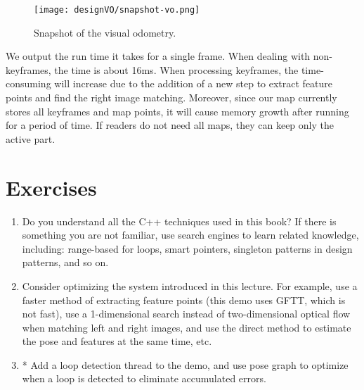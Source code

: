 \begin{figure}[!htp]
	\centering    
	\texttt{[image: designVO/snapshot-vo.png]}\\
	\caption{Snapshot of the visual odometry.}
	\label{fig:snapshot-vo}
\end{figure}

We output the run time it takes for a single frame. When dealing with non-keyframes, the time is about 16ms. When processing keyframes, the time-consuming will increase due to the addition of a new step to extract feature points and find the right image matching. Moreover, since our map currently stores all keyframes and map points, it will cause memory growth after running for a period of time. If readers do not need all maps, they can keep only the active part.

\section*{Exercises}
\begin{enumerate}
	\item Do you understand all the C++ techniques used in this book? If there is something you are not familiar, use search engines to learn related knowledge, including: range-based for loops, smart pointers, singleton patterns in design patterns, and so on.
	\item Consider optimizing the system introduced in this lecture. For example, use a faster method of extracting feature points (this demo uses GFTT, which is not fast), use a 1-dimensional search instead of two-dimensional optical flow when matching left and right images, and use the direct method to estimate the pose and features at the same time, etc.
	\item* Add a loop detection thread to the demo, and use pose graph to optimize when a loop is detected to eliminate accumulated errors.
\end{enumerate}


